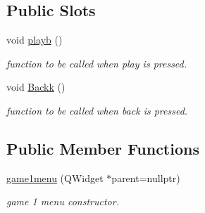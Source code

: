 \subsection*{Public Slots}
\begin{DoxyCompactItemize}
\item 
void \hyperlink{classgame1menu_a52cfac581c4ec8dee4b2790b773014c7}{playb} ()
\begin{DoxyCompactList}\small\item\em function to be called when play is pressed. \end{DoxyCompactList}\item 
void \hyperlink{classgame1menu_aacd43f1621af0ac39370c5f1b16868fa}{Backk} ()
\begin{DoxyCompactList}\small\item\em function to be called when back is pressed. \end{DoxyCompactList}\end{DoxyCompactItemize}
\subsection*{Public Member Functions}
\begin{DoxyCompactItemize}
\item 
\hyperlink{classgame1menu_ae63648153a4fb03068f9ee8dc3bc79dc}{game1menu} (Q\+Widget $\ast$parent=nullptr)
\begin{DoxyCompactList}\small\item\em game 1 menu constructor. \end{DoxyCompactList}\end{DoxyCompactItemize}
